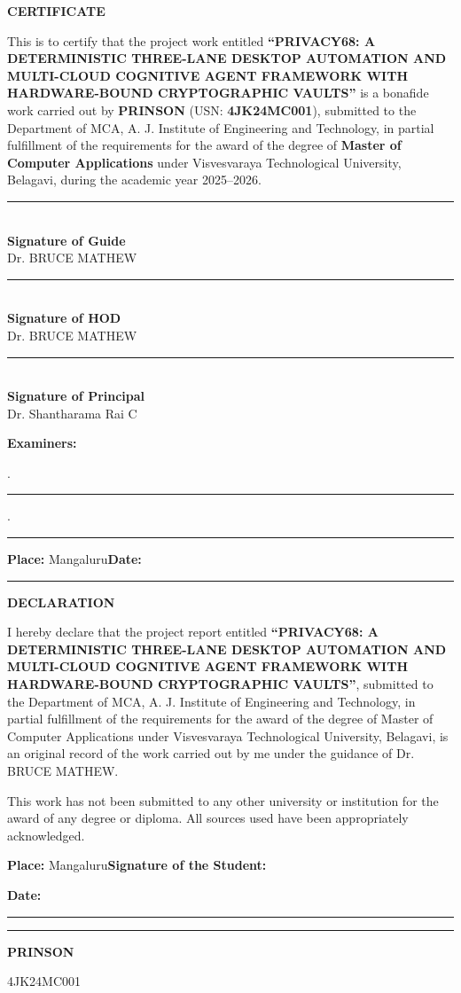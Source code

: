 \documentclass[12pt,letterpaper,oneside]{report}
\newcommand{\projecttitle}{PRIVACY68: A DETERMINISTIC THREE-LANE DESKTOP AUTOMATION AND MULTI-CLOUD COGNITIVE AGENT FRAMEWORK WITH HARDWARE-BOUND CRYPTOGRAPHIC VAULTS}
\newcommand{\studentname}{PRINSON}
\newcommand{\studentusn}{4JK24MC001} %
\newcommand{\guidename}{Dr. BRUCE MATHEW}
\newcommand{\hodname}{Dr. BRUCE MATHEW}
\newcommand{\principalname}{Dr. Shantharama Rai C}
\newcommand{\academicyear}{2025--2026}
\newcommand{\institution}{A. J. Institute of Engineering and Technology}
\newcommand{\department}{Department of MCA}
\newcommand{\signatureline}[2]{%
  \begin{minipage}[t]{0.30\textwidth}\centering
    \rule{\linewidth}{0.5pt}\\[-1pt]
    \textbf{#1}\\
    {\small #2}
  \end{minipage}%
}
\newcommand{\frontheading}[1]{%
  \begin{center}\bfseries\fontsize{15}{19}\selectfont #1\end{center}
  \vspace{1cm}
}
\begin{document}
\clearpage
\frontheading{CERTIFICATE}
\noindent This is to certify that the project work entitled
\textbf{``\projecttitle''} is a bonafide work carried out by
\textbf{\studentname} (USN: \textbf{\studentusn}),
submitted to the \department, \institution, in partial
fulfillment of the requirements for the award of the degree of
\textbf{Master of Computer Applications} under
Visvesvaraya Technological University, Belagavi, during the academic year
\academicyear.

\vspace{1in}
\noindent
\signatureline{Signature of Guide}{\guidename}\hfill
\signatureline{Signature of HOD}{\hodname}\hfill
\signatureline{Signature of Principal}{\principalname}

\vspace{1.05in}
\noindent\textbf{Examiners:}\par
\vspace{0.30in}
. \rule{2.8in}{0.5pt}\par
\vspace{0.28in}
. \rule{2.8in}{0.5pt}\par
\vspace{0.55in}
\noindent\textbf{Place:} Mangaluru\hfill\textbf{Date:} \rule{1.1in}{0.5pt}

\clearpage
\frontheading{DECLARATION}
\noindent I hereby declare that the project report entitled
\textbf{``\projecttitle''}, submitted to the \department,
\institution, in partial fulfillment of the requirements for the award
of the degree of Master of Computer Applications under Visvesvaraya
Technological University, Belagavi, is an original record of the work
carried out by me under the guidance of \guidename.

\par\medskip
\noindent This work has not been submitted to any other university or
institution for the award of any degree or diploma. All sources used have
been appropriately acknowledged.

\vspace{1.3in}
\noindent\textbf{Place:} Mangaluru\hfill\textbf{Signature of the Student:}\par
\noindent\textbf{Date:} \rule{1.1in}{0.5pt}\hfill\rule{2.4in}{0.5pt}\par
\noindent\hfill\textbf{\studentname}\par
\noindent\hfill\studentusn
\end{document}

